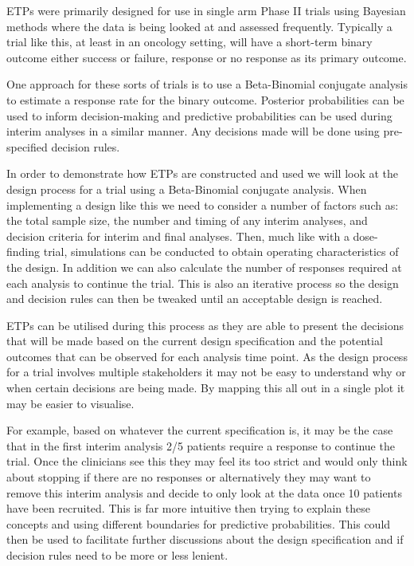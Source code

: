 ETPs were primarily designed for use in single arm Phase \RN{2} trials using Bayesian methods where the data is being looked at and assessed frequently. Typically a trial like this, at least in an oncology setting, will have a short-term binary outcome either success or failure, response or no response as its primary outcome. 

One approach for these sorts of trials is to use a Beta-Binomial conjugate analysis to estimate a response rate for the binary outcome. Posterior probabilities can be used to inform decision-making and predictive probabilities can be used during interim analyses in a similar manner. Any decisions made will be done using pre-specified decision rules.

In order to demonstrate how ETPs are constructed and used we will look at the design process for a trial using a Beta-Binomial conjugate analysis. When implementing a design like this we need to consider a number of factors such as: the total sample size, the number and timing of any interim analyses, and decision criteria for interim and final analyses. Then, much like with a dose-finding trial, simulations can be conducted to obtain operating characteristics of the design. In addition we can also calculate the number of responses required at each analysis to continue the trial. This is also an iterative process so the design and decision rules can then be tweaked until an acceptable design is reached. 

ETPs can be utilised during this process as they are able to present the decisions that will be made based on the current design specification and the potential outcomes that can be observed for each analysis time point. As the design process for a trial involves multiple stakeholders it may not be easy to understand why or when certain decisions are being made. By mapping this all out in a single plot it may be easier to visualise. 

For example, based on whatever the current specification is, it may be the case that in the first interim analysis 2/5 patients require a response to continue the trial. Once the clinicians see this they may feel its too strict and would only think about stopping if there are no responses or alternatively they may want to remove this interim analysis and decide to only look at the data once 10 patients have been recruited. This is far more intuitive then trying to explain these concepts and using different boundaries for predictive probabilities. This could then be used to facilitate further discussions about the design specification and if decision rules need to be more or less lenient.  

